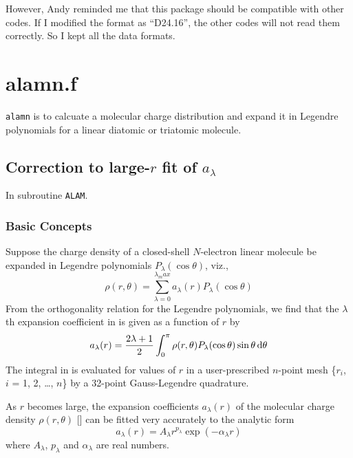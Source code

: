 \documentclass[aps,pra,groupedaddress,
                amsfonts,amssymb,
                preprint
    ]{revtex4}
\newcommand{\code}[1]{\texttt{#1}}
\begin{document}
However, Andy reminded me that this package should be compatible with
other codes. If I modified the format as ``D24.16'', the other codes
will not read them correctly. So I kept all the data formats.

\section{alamn.f}
\code{alamn} is to calcuate a molecular charge distribution and expand
it in Legendre polynomials for a linear diatomic or triatomic
molecule.

\subsection{Correction to large-$r$ fit of $a_\lambda$}
In subroutine \code{ALAM}.

\subsubsection{Basic Concepts}
Suppose the charge density of a closed-shell $N$-electron linear
molecule be expanded in Legendre polynomials $P_\lambda(\cos\theta)$,
viz.,
\begin{equation}
  \label{eq:ELP}
  \rho(r,\theta) = \sum_{\lambda=0}^{\lambda_max}a_\lambda(r)
                   P_\lambda(\cos\theta)
\end{equation}
From the orthogonality relation for the Legendre polynomials, we find
that the $\lambda$th expansion coefficient in  is given as a
function of $r$ by
\begin{equation}
  \label{eq:sal}
  a_\lambda(r) = \dfrac{2\lambda+1}{2}\int_0^\pi\rho(r,\theta)
                 P_\lambda(\cos\theta)\sin\theta\,\mathrm{d}\theta
\end{equation}
The integral in  is evaluated for values of $r$ in a
user-prescribed $n$-point mesh \{$r_i$, $i$ = 1, 2, \ldots, $n$\} by a
32-point Gauss-Legendre quadrature.

As $r$ becomes large, the expansion coefficients $a_\lambda(r)$ of the
molecular charge density $\rho(r,\theta)$ [] can be fitted very
accurately to the analytic form
\begin{equation}
  \label{eq:lal}
  a_\lambda(r) = A_\lambda r^{p_\lambda}\exp(-\alpha_\lambda r)
\end{equation}
where $A_\lambda$, $p_\lambda$ and $\alpha_\lambda$ are real numbers.
\end{document}
